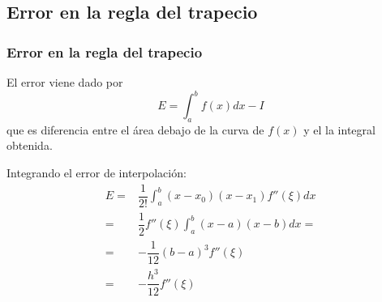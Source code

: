 \subsection{Error en la regla del trapecio}
\begin{frame}
\frametitle{Error en la regla del trapecio}
El error viene dado por
\[ E = \int_{a}^{b} f(x) dx - I \]
que es diferencia entre el \'{a}rea debajo de la curva de $f(x)$ y el la integral obtenida. 
\end{frame}
\begin{frame}
Integrando el error de interpolaci\'{o}n:
\[ \begin{split} 
E =& \dfrac{1}{2!} \int_{a}^{b} (x-x_{0})(x-x_{1}) f''(\xi) dx  \\
=& \dfrac{1}{2} f''(\xi) \int_{a}^{b} (x-a)(x-b) dx = \\
=& -\dfrac{1}{12}(b-a)^{3} f''(\xi) \\
=& -\dfrac{h^{3}}{12}f''(\xi) \\
\end{split} \]
\end{frame}
